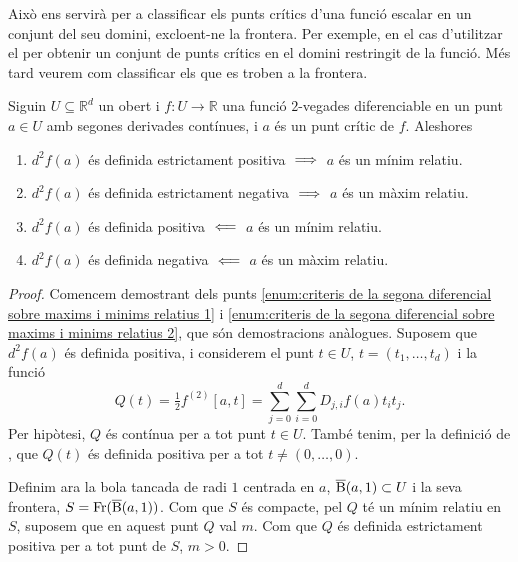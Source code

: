 \documentclass[../Apunts.tex]{subfiles}
\begin{document}
	Això ens servirà per a classificar els punts crítics d'una funció escalar en un conjunt del seu domini, excloent-ne la frontera. Per exemple, en el cas d'utilitzar el  per obtenir un conjunt de punts crítics en el domini restringit de la funció. Més tard veurem com classificar els que es troben a la frontera.
	\begin{proposition}\label{prop:criteris de la segona diferencial sobre maxims i minims relatius}
		Siguin \(U\subseteq\mathbb{R}^{d}\) un obert i \(f\colon U\to\mathbb{R}\) una funció \(2\)-vegades diferenciable en un punt \(a\in U\) amb segones derivades contínues, i \(a\) és un punt crític de \(f\). Aleshores
		\begin{enumerate}
			\item\label{enum:criteris de la segona diferencial sobre maxims i minims relatius 1} \(d^{2}f(a)\) és definida estrictament positiva \(\implies\)  \(a\) és un mínim relatiu.
			\item\label{enum:criteris de la segona diferencial sobre maxims i minims relatius 2} \(d^{2}f(a)\) és definida estrictament negativa \(\implies\)  \(a\) és un màxim relatiu.
			\item\label{enum:criteris de la segona diferencial sobre maxims i minims relatius 3} \(d^{2}f(a)\) és definida positiva \(\impliedby\)  \(a\) és un mínim relatiu.
			\item\label{enum:criteris de la segona diferencial sobre maxims i minims relatius 4} \(d^{2}f(a)\) és definida negativa \(\impliedby\)  \(a\) és un màxim relatiu.
		\end{enumerate}
		\begin{proof}
			Comencem demostrant dels punts \eqref{enum:criteris de la segona diferencial sobre maxims i minims relatius 1} i \eqref{enum:criteris de la segona diferencial sobre maxims i minims relatius 2}, que són demostracions anàlogues. Suposem que \(d^{2}f(a)\) és definida positiva, i considerem el punt \(t\in U\), \(t=(t_{1},\dots,t_{d})\) i la funció
			\[Q(t)=\tfrac{1}{2}f^{(2)}[a,t]=\sum_{j=0}^{d}\sum_{i=0}^{d}D_{j,i}f(a)t_{i}t_{j}.\]
			Per hipòtesi, \(Q\) és contínua per a tot punt \(t\in U\). També tenim, per la definició de , que \(Q(t)\) és definida positiva per a tot \(t\neq(0,\dots,0)\).
			
			Definim ara la bola tancada de radi \(1\) centrada en \(a\), \(\overline{\operatorname{B}}(a,1)\subset U\) i la seva frontera, \(S=\operatorname{Fr}(\overline{\operatorname{B}}(a,1))\). Com que \(S\) és compacte, pel   \(Q\) té un mínim relatiu en \(S\), suposem que en aquest punt \(Q\) val \(m\). Com que \(Q\) és definida estrictament positiva per a tot punt de \(S\), \(m>0\).
			

\end{proof}
\end{proposition}
\end{document}
